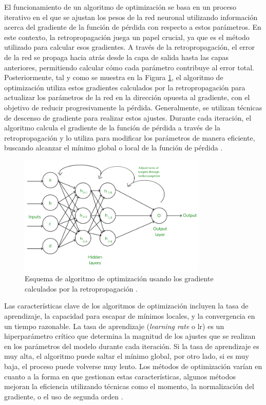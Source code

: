El funcionamiento de un algoritmo de optimización se basa en un proceso iterativo en el que se ajustan los pesos de la red neuronal utilizando información acerca del gradiente de la función de pérdida con respecto a estos parámetros. En este contexto, la retropropagación juega un papel crucial, ya que es el método utilizado para calcular esos gradientes. A través de la retropropagación, el error de la red se propaga hacia atrás desde la capa de salida hasta las capas anteriores, permitiendo calcular cómo cada parámetro contribuye al error total. Posteriormente, tal y como se muestra en la Figura \ref{fig:esq-Optimizacion}, el algoritmo de optimización utiliza estos gradientes calculados por la retropropagación para actualizar los parámetros de la red en la dirección opuesta al gradiente, con el objetivo de reducir progresivamente la pérdida. Generalmente, se utilizan técnicas de descenso de gradiente para realizar estos ajustes. Durante cada iteración, el algoritmo calcula el gradiente de la función de pérdida a través de la retropropagación y lo utiliza para modificar los parámetros de manera eficiente, buscando alcanzar el mínimo global o local de la función de pérdida \cite{bottou2010large}.

\begin{figure}[H]
    \centering
    \includegraphics[width=0.8\textwidth]{./img/modelo/retropropagacion.png}
    \caption{Esquema de algoritmo de optimización usando los gradiente calculados por la retropropagación \cite{msmk2023backpropagation}.}
    \label{fig:esq-Optimizacion}
\end{figure}


Las características clave de los algoritmos de optimización incluyen la tasa de aprendizaje, la capacidad para escapar de mínimos locales, y la convergencia en un tiempo razonable. La tasa de aprendizaje (\textit{learning rate} o lr) es un hiperparámetro crítico que determina la magnitud de los ajustes que se realizan en los parámetros del modelo durante cada iteración. Si la tasa de aprendizaje es muy alta, el algoritmo puede saltar el mínimo global, por otro lado, si es muy baja, el proceso puede volverse muy lento. Los métodos de optimización varían en cuanto a la forma en que gestionan estas características, algunos métodos mejoran la eficiencia utilizando técnicas como el momento, la normalización del gradiente, o el uso de segunda orden \cite{kingma2014adam}.


